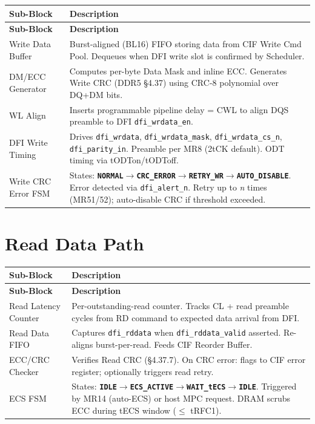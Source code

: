 \documentclass[11pt,a4paper]{article}
\newcommand{\st}[1]{\textcolor{ddrblue}{\texttt{\textbf{#1}}}}
\begin{document}
\begin{longtable}{L{3.5cm} L{10.9cm}}
\toprule
\textbf{Sub-Block} & \textbf{Description} \\
\midrule
\endfirsthead\toprule\textbf{Sub-Block}&\textbf{Description}\\\midrule\endhead\bottomrule\endfoot
{}
Write Data Buffer     & Burst-aligned (BL16) FIFO storing data from CIF Write Cmd Pool. Dequeues when DFI write slot is confirmed by Scheduler. \\
DM/ECC Generator      & Computes per-byte Data Mask and inline ECC. Generates Write CRC (DDR5 §4.37) using CRC-8 polynomial over DQ+DM bits. \\
WL Align              & Inserts programmable pipeline delay = CWL to align DQS preamble to DFI \texttt{dfi\_wrdata\_en}. \\
DFI Write Timing      & Drives \texttt{dfi\_wrdata}, \texttt{dfi\_wrdata\_mask}, \texttt{dfi\_wrdata\_cs\_n}, \texttt{dfi\_parity\_in}. Preamble per MR8 (2tCK default). ODT timing via tODTon/tODToff. \\
Write CRC Error FSM   & States: \st{NORMAL}$\to$\st{CRC\_ERROR}$\to$\st{RETRY\_WR}$\to$\st{AUTO\_DISABLE}. Error detected via \texttt{dfi\_alert\_n}. Retry up to \textit{n} times (MR51/52); auto-disable CRC if threshold exceeded. \\
\end{longtable}

\section{Read Data Path}

\begin{longtable}{L{3.5cm} L{10.9cm}}
\toprule
\textbf{Sub-Block} & \textbf{Description} \\
\midrule
\endfirsthead\toprule\textbf{Sub-Block}&\textbf{Description}\\\midrule\endhead\bottomrule\endfoot
{}
Read Latency Counter  & Per-outstanding-read counter. Tracks CL + read preamble cycles from RD command to expected data arrival from DFI. \\
Read Data FIFO        & Captures \texttt{dfi\_rddata} when \texttt{dfi\_rddata\_valid} asserted. Re-aligns burst-per-read. Feeds CIF Reorder Buffer. \\
ECC/CRC Checker       & Verifies Read CRC (§4.37.7). On CRC error: flags to CIF error register; optionally triggers read retry. \\
ECS FSM               & States: \st{IDLE}$\to$\st{ECS\_ACTIVE}$\to$\st{WAIT\_tECS}$\to$\st{IDLE}. Triggered by MR14 (auto-ECS) or host MPC request. DRAM scrubs ECC during tECS window ($\leq$ tRFC1). \\
\end{longtable}
\end{document}
